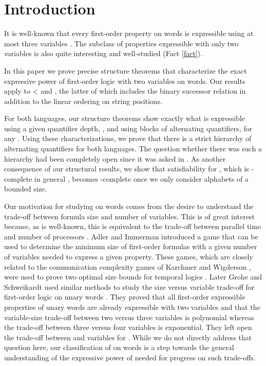 \documentclass{LMCS}
\begin{document}
\maketitle

\section{Introduction} \label{sec:intro}

It is well-known that every first-order property on words is
expressible using at most three variables \cite{IK89,K68}. 
The subclass of properties expressible with only
two variables is also quite interesting and well-studied (Fact
\ref{fact}).  

In this paper we prove precise structure theorems that characterize
the exact expressive power of first-order logic with two variables on
words.  Our results apply to < and , the
latter of which includes the binary successor relation in addition to
the linear ordering on string positions.  

For both languages, our structure theorems show exactly what is expressible
using a given quantifier depth, , and using  blocks of alternating
quantifiers, for any . Using these characterizations, we prove that
there is a strict hierarchy of alternating quantifiers for both languages.
The question whether there was such a hierarchy had been completely open
since it was asked in \cite{EVW97,EVW02}. As another consequence of our
structural results, we show that satisfiability for , which is
\NEXP-complete in general \cite{EVW02}, becomes \NP-complete once we only
consider alphabets of a bounded size.

Our motivation for studying  on words comes from the desire to
understand the trade-off between formula size and number of
variables.  This is of great interest because, as is well-known, this
is equivalent to the trade-off between parallel time and number of
processors \cite{I99}.  Adler and Immerman \cite{AI03}
 introduced a game that can be used to determine the
minimum size of first-order formulas with a given number of variables
needed to express a given property.  These games, which are closely
related to the communication complexity games of Karchmer and
Wigderson  \cite{KW90}, were used to prove two optimal size bounds
for temporal logics \cite{AI03}.  Later Grohe and Schweikardt used
similar methods to study the size versus variable trade-off for
first-order logic on unary words \cite{GS05}.  They proved that all
first-order expressible properties of unary words are already
expressible with two variables and that the variable-size trade-off
between two versus three variables is polynomial whereas the trade-off
between three versus four variables is exponential.  They left open
the trade-off between  and  variables for .  While we
do not directly address that question here, our classification of
 on words is a step towards the general understanding of the
expressive power of  needed for progress on such trade-offs.
\end{document}
